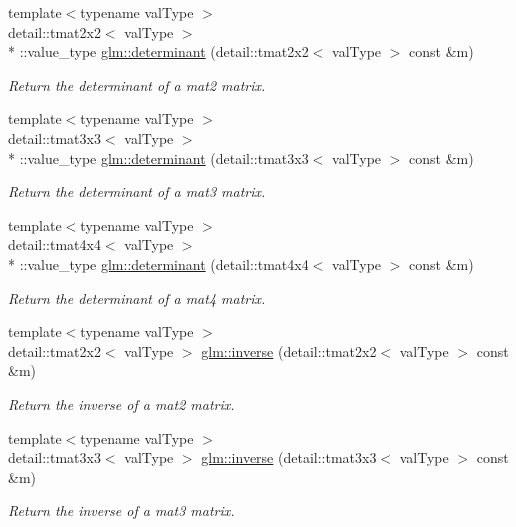 \begin{DoxyCompactItemize}
{\footnotesize template$<$typename val\-Type $>$ }\\detail\-::tmat2x2$<$ val\-Type $>$\\*
\-::value\-\_\-type \hyperlink{group__core__func__matrix_gad3bfb2098e1572d2131a261c1fb76dd4}{glm\-::determinant} (detail\-::tmat2x2$<$ val\-Type $>$ const \&m)
\begin{DoxyCompactList}\small\item\em Return the determinant of a mat2 matrix. \end{DoxyCompactList}\item 
{\footnotesize template$<$typename val\-Type $>$ }\\detail\-::tmat3x3$<$ val\-Type $>$\\*
\-::value\-\_\-type \hyperlink{group__core__func__matrix_ga2f26bb474e077cf03b9db23f813e8450}{glm\-::determinant} (detail\-::tmat3x3$<$ val\-Type $>$ const \&m)
\begin{DoxyCompactList}\small\item\em Return the determinant of a mat3 matrix. \end{DoxyCompactList}\item 
{\footnotesize template$<$typename val\-Type $>$ }\\detail\-::tmat4x4$<$ val\-Type $>$\\*
\-::value\-\_\-type \hyperlink{group__core__func__matrix_ga1daa306eecf6e8b379626d761b8c222f}{glm\-::determinant} (detail\-::tmat4x4$<$ val\-Type $>$ const \&m)
\begin{DoxyCompactList}\small\item\em Return the determinant of a mat4 matrix. \end{DoxyCompactList}\item 
{\footnotesize template$<$typename val\-Type $>$ }\\detail\-::tmat2x2$<$ val\-Type $>$ \hyperlink{group__core__func__matrix_gada3384a86cf38a1fd96275194b8ba8c0}{glm\-::inverse} (detail\-::tmat2x2$<$ val\-Type $>$ const \&m)
\begin{DoxyCompactList}\small\item\em Return the inverse of a mat2 matrix. \end{DoxyCompactList}\item 
{\footnotesize template$<$typename val\-Type $>$ }\\detail\-::tmat3x3$<$ val\-Type $>$ \hyperlink{group__core__func__matrix_ga1a455651f7ba323ade0cd9191542b179}{glm\-::inverse} (detail\-::tmat3x3$<$ val\-Type $>$ const \&m)
\begin{DoxyCompactList}\small\item\em Return the inverse of a mat3 matrix. \end{DoxyCompactList}\item 

\end{DoxyCompactItemize}
